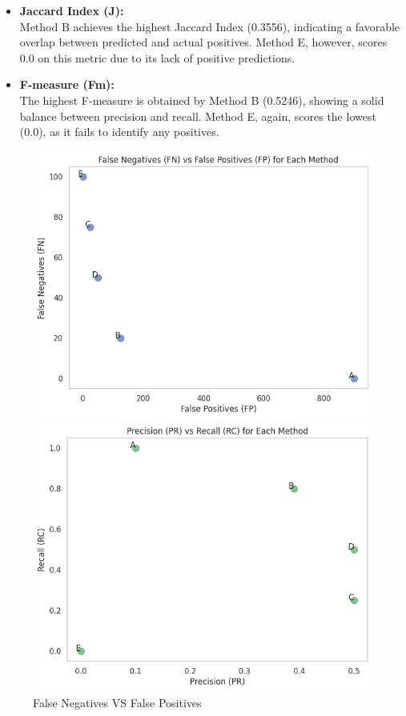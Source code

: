\documentclass{article}
\begin{document}
\begin{itemize}
	\item \textbf{Jaccard Index (J):} \\
	Method B achieves the highest Jaccard Index (0.3556), indicating a favorable overlap between predicted and actual positives. Method E, however, scores 0.0 on this metric due to its lack of positive predictions.
	
	\item \textbf{F-measure (Fm):} \\
	The highest F-measure is obtained by Method B (0.5246), showing a solid balance between precision and recall. Method E, again, scores the lowest (0.0), as it fails to identify any positives.
\end{itemize}

\begin{figure}[H]
	\centering
	\begin{minipage}{0.37\textwidth}
		\centering
		\includegraphics[width=\textwidth]{images/FN-FP.png}
		\caption{False Negatives VS False Positives}
		\label{fig:FN-FP}
	\end{minipage}
	\hspace{0.03\textwidth} %
	\begin{minipage}{0.37\textwidth}
		\centering
		\includegraphics[width=\textwidth]{images/PR-RC.png}

\end{minipage}
\end{figure}
\end{document}
